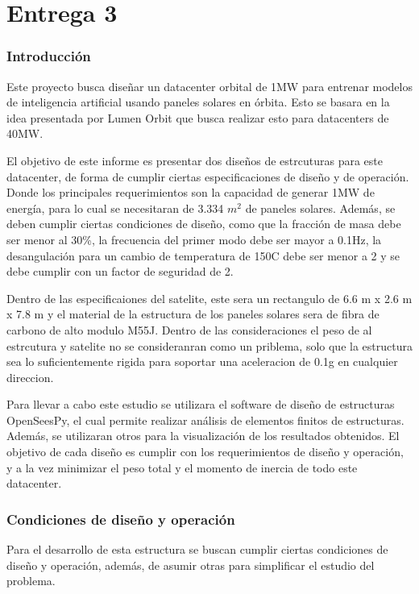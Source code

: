 \part{Entrega 3}

\section{Introducción}

Este proyecto busca diseñar un datacenter orbital de 1MW para entrenar modelos de inteligencia artificial usando paneles solares en órbita. Esto se basara en la idea presentada por Lumen Orbit que busca realizar esto para datacenters de 40MW.

El objetivo de este informe es presentar dos diseños de estrcuturas para este datacenter, de forma de cumplir ciertas especificaciones de diseño y de operación. Donde los principales requerimientos son la capacidad de generar 1MW de energía, para lo cual se necesitaran de 3.334 $m^2$ de paneles solares. Además, se deben cumplir ciertas condiciones de diseño, como que la fracción de masa debe ser menor al 30\%, la frecuencia del primer modo debe ser mayor a 0.1Hz, la desangulación para un cambio de temperatura de 150\textdegree{}C debe ser menor a 2\textdegree{} y se debe cumplir con un factor de seguridad de 2.

Dentro de las especificaiones del satelite, este sera un rectangulo de 6.6 m x 2.6 m x 7.8 m y el material de la estructura de los paneles solares sera de fibra de carbono de alto modulo M55J. Dentro de las consideraciones el peso de al estrcutura y satelite no se consideranran como un priblema, solo que la estructura sea lo suficientemente rigida para soportar una aceleracion de 0.1g en cualquier direccion. 

Para llevar a cabo este estudio se utilizara el software de diseño de estructuras OpenSeesPy, el cual permite realizar análisis de elementos finitos de estructuras. Además, se utilizaran otros para la visualización de los resultados obtenidos. El objetivo de cada diseño es cumplir con los requerimientos de diseño y operación, y a la vez minimizar el peso total y el momento de inercia de todo este datacenter.

\newpage
\section{Condiciones de diseño y operación}

Para el desarrollo de esta estructura se buscan cumplir ciertas condiciones de diseño y operación, además, de asumir otras para simplificar el estudio del problema. 


